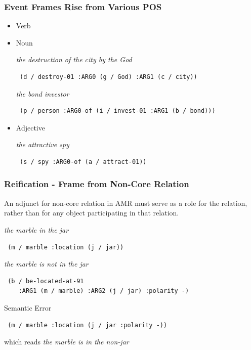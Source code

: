 \documentclass{beamer}
\begin{document}
\begin{frame}[fragile]
    \frametitle{Event Frames Rise from Various POS}

    \begin{itemize}
        \item Verb \pause
        \item Noun

            \begin{examples}
            \emph{the destruction of the city by the God}
            \begin{verbatim} (d / destroy-01 :ARG0 (g / God) :ARG1 (c / city)) \end{verbatim}
            \end{examples}

            \begin{examples}
            \emph{the bond investor}
            \begin{verbatim} (p / person :ARG0-of (i / invest-01 :ARG1 (b / bond))) \end{verbatim}
            \end{examples}


            \pause

        \item Adjective

            \begin{examples}
            \emph{the attractive spy}
            \begin{verbatim} (s / spy :ARG0-of (a / attract-01)) \end{verbatim}
            \end{examples}
    \end{itemize}
\end{frame}

\begin{frame}[fragile]
    \frametitle{Reification - Frame from Non-Core Relation}

    An adjunct for non-core relation in AMR must serve as a role for the relation,
    rather than for any object participating in that relation.

    \begin{examples}
    \emph{the marble in the jar}
    \begin{verbatim} (m / marble :location (j / jar)) \end{verbatim}

    \emph{the marble is not in the jar}
    \begin{verbatim} (b / be-located-at-91
    :ARG1 (m / marble) :ARG2 (j / jar) :polarity -) \end{verbatim}
    \end{examples}

    \begin{alertblock}{Semantic Error}
    \begin{verbatim} (m / marble :location (j / jar :polarity -)) \end{verbatim}
    which reads \emph{the marble is in the non-jar}
    \end{alertblock}
\end{frame}
\end{document}
